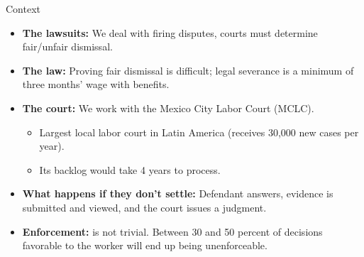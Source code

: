 \documentclass[9pt]{beamer}
\begin{document}
\begin{frame}{Context}
   \begin{itemize}

       \item \textbf{The lawsuits:} We deal with firing disputes, courts must determine fair/unfair dismissal. 
       \vspace{0.05in}
         
        \item \textbf{The law:} Proving fair dismissal is difficult; legal severance is a minimum of three months' wage with benefits.  
        \vspace{0.05in}
         
        \item \textbf{The court:} We work with the Mexico City Labor Court (MCLC).
        \vspace{0.05in}
        \begin{itemize}
            \item Largest local labor court in Latin America (receives 30,000 new cases per year).
            \item Its backlog would take 4 years to process.
        \end{itemize}
                                
       
       \item \textbf{What happens if they don't settle:} Defendant answers, evidence is submitted and viewed, and the court issues a judgment.
       \vspace{0.05in}
       
       \item \textbf{Enforcement:} is not trivial. Between 30 and 50 percent of decisions favorable to the worker will end up being unenforceable. 
       
       \end{itemize}         
        
     \end{frame}
     
\end{document}
